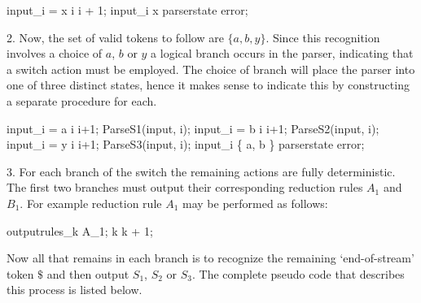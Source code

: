 \documentclass[11pt]{article}
\begin{document}
\begin{center}
\begin{gcl}
\IF input_i = x \rightarrow i \becomes i + 1;
\BAR input_i \neq x \rightarrow parserstate \becomes error;
\FI
\end{gcl}
\end{center}

2. Now, the set of valid tokens to follow are $\{ a, b, y \}$. 
Since this recognition involves a choice of $a$, $b$ or $y$ a logical branch occurs in the parser, indicating that a switch action must be employed.
The choice of branch will place the parser into one of three distinct states, hence it makes sense to indicate this by constructing a separate procedure for each.

\begin{center}
\begin{gcl}
\IF input_i = a \rightarrow 
                \qquad i \becomes i+1; 
                \qquad ParseS1(input, i);
\BAR input_i = b \rightarrow 
                \qquad i \becomes i+1;
                \qquad ParseS2(input, i);
\BAR input_i = y \rightarrow 
                \qquad i \becomes i+1; 
                \qquad ParseS3(input, i);
\BAR input_i \notin \{ a, b \} \rightarrow 
                \qquad parserstate \becomes error;
\FI
\end{gcl}
\end{center}

3. For each branch of the switch the remaining actions are fully deterministic. 
The first two branches must output their corresponding reduction rules $A_1$ and $B_1$. 
For example reduction rule $A_1$ may be performed as follows:

\begin{center}
\begin{gcl}
outputrules_k \becomes A_1;
k \becomes k + 1;
\end{gcl}
\end{center}

Now all that remains in each branch is to recognize the remaining `end-of-stream' token $\$$ and then output $S_1$, $S_2$ or $S_3$. 
The complete pseudo code that describes this process is listed below.
\end{document}
